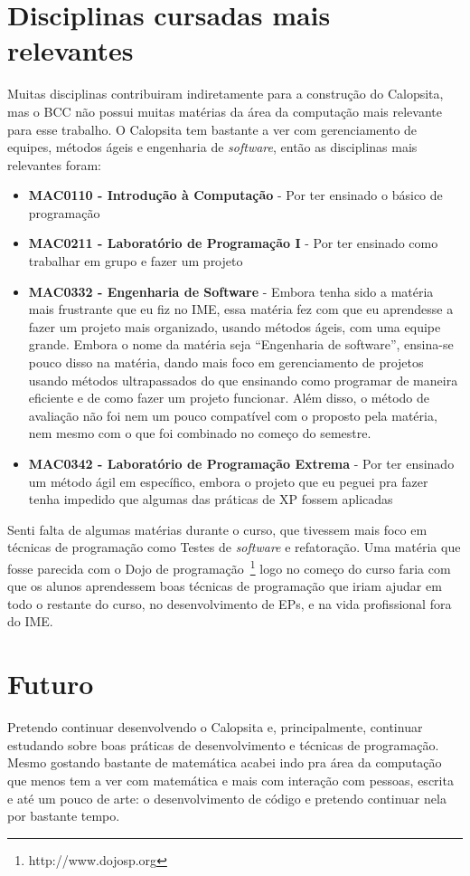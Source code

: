 \documentclass[titlepage,a4paper]{article}
\newcommand{\software}{\textit{software}}
\newcommand{\calopsita}{Calopsita}
\begin{document}
\section{Disciplinas cursadas mais relevantes}

Muitas disciplinas contribuiram indiretamente para a construção do \calopsita{}, mas o BCC não possui muitas matérias da área da computação mais relevante para esse trabalho. O \calopsita{} tem bastante a ver com gerenciamento de equipes, métodos ágeis e engenharia de \software{}, então as disciplinas mais relevantes foram:

\begin{itemize}
	\item{\textbf{MAC0110 - Introdução à Computação} - Por ter ensinado o básico de programação}
	\item{\textbf{MAC0211 - Laboratório de Programação I} - Por ter ensinado como trabalhar em grupo e fazer um projeto}
	\item{\textbf{MAC0332 - Engenharia de Software} - Embora tenha sido a matéria mais frustrante que eu fiz no IME, essa matéria fez com que eu aprendesse a fazer um projeto mais organizado, usando métodos ágeis, com uma equipe grande. Embora o nome da matéria seja ``Engenharia de software'', ensina-se pouco disso na matéria, dando mais foco em gerenciamento de projetos usando métodos ultrapassados do que ensinando como programar de maneira eficiente e de como fazer um projeto funcionar. Além disso, o método de avaliação não foi nem um pouco compatível com o proposto pela matéria, nem mesmo com o que foi combinado no começo do semestre.}
	\item{\textbf{MAC0342 - Laboratório de Programação Extrema } - Por ter ensinado um método ágil em específico, embora o projeto que eu peguei pra fazer tenha impedido que algumas das práticas de XP fossem aplicadas}
\end{itemize}

Senti falta de algumas matérias durante o curso, que tivessem mais foco em técnicas de programação como Testes de \software{} e refatoração. Uma matéria que fosse parecida com o Dojo de programação~\footnote{http://www.dojosp.org} logo no começo do curso faria com que os alunos aprendessem boas técnicas de programação que iriam ajudar em todo o restante do curso, no desenvolvimento de EPs, e na vida profissional fora do IME.

\section{Futuro}

Pretendo continuar desenvolvendo o \calopsita{} e, principalmente, continuar estudando sobre boas práticas de desenvolvimento e técnicas de programação. Mesmo gostando bastante de matemática acabei indo pra área da computação que menos tem a ver com matemática e mais com interação com pessoas, escrita e até um pouco de arte: o desenvolvimento de código e pretendo continuar nela por bastante tempo.
\end{document}
